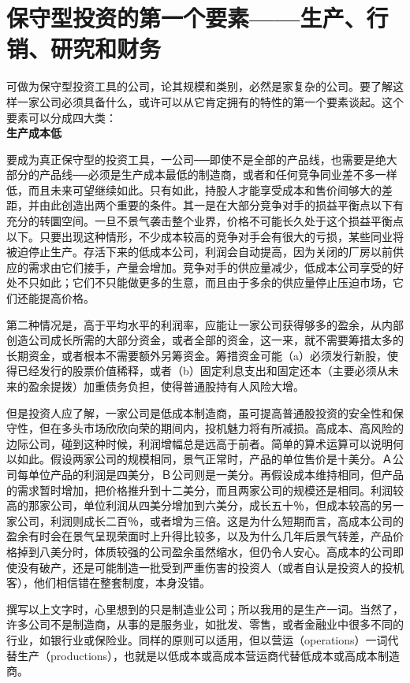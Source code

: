 \documentclass[UTF8,a4paper,zihao=-4,fontset = windows]{ctexart} %
\begin{document}
\section{保守型投资的第一个要素——生产、行销、研究和财务}

可做为保守型投资工具的公司，论其规模和类别，必然是家复杂的公司。要了解这样一家公司必须具备什么，或许可以从它肯定拥有的特性的第一个要素谈起。这个要素可以分成四大类：
\\

\textbf{生产成本低}


要成为真正保守型的投资工具，一公司──即使不是全部的产品线，也需要是绝大部分的产品线──必须是生产成本最低的制造商，或者和任何竞争同业差不多一样低，而且未来可望继续如此。只有如此，持股人才能享受成本和售价间够大的差距，并由此创造出两个重要的条件。其一是在大部分竞争对手的损益平衡点以下有充分的转圜空间。一旦不景气袭击整个业界，价格不可能长久处于这个损益平衡点以下。只要出现这种情形，不少成本较高的竞争对手会有很大的亏损，某些同业将被迫停止生产。存活下来的低成本公司，利润会自动提高，因为关闭的厂房以前供应的需求由它们接手，产量会增加。竞争对手的供应量减少，低成本公司享受的好处不只如此；它们不只能做更多的生意，而且由于多余的供应量停止压迫市场，它们还能提高价格。

第二种情况是，高于平均水平的利润率，应能让一家公司获得够多的盈余，从内部创造公司成长所需的大部分资金，或者全部的资金，这一来，就不需要筹措太多的长期资金，或者根本不需要额外另筹资金。筹措资金可能（a）必须发行新股，使得已经发行的股票价值稀释，或者（b）固定利息支出和固定还本（主要必须从未来的盈余提拨）加重债务负担，使得普通股持有人风险大增。

但是投资人应了解，一家公司是低成本制造商，虽可提高普通股投资的安全性和保守性，但在多头市场欣欣向荣的期间内，投机魅力将有所减损。高成本、高风险的边际公司，碰到这种时候，利润增幅总是远高于前者。简单的算术运算可以说明何以如此。假设两家公司的规模相同，景气正常时，产品的单位售价是十美分。Ａ公司每单位产品的利润是四美分，Ｂ公司则是一美分。再假设成本维持相同，但产品的需求暂时增加，把价格推升到十二美分，而且两家公司的规模还是相同。利润较高的那家公司，单位利润从四美分增加到六美分，成长五十％，但成本较高的另一家公司，利润则成长二百％，或者增为三倍。这是为什么短期而言，高成本公司的盈余有时会在景气呈现荣面时上升得比较多，以及为什么几年后景气转差，产品价格掉到八美分时，体质较强的公司盈余虽然缩水，但仍令人安心。高成本的公司即使没有破产，还是可能制造一批受到严重伤害的投资人（或者自认是投资人的投机客），他们相信错在整套制度，本身没错。

撰写以上文字时，心里想到的只是制造业公司；所以我用的是生产一词。当然了，许多公司不是制造商，从事的是服务业，如批发、零售，或者金融业中很多不同的行业，如银行业或保险业。同样的原则可以适用，但以营运（operations）一词代替生产（productions），也就是以低成本或高成本营运商代替低成本或高成本制造商。
\\
\end{document}

